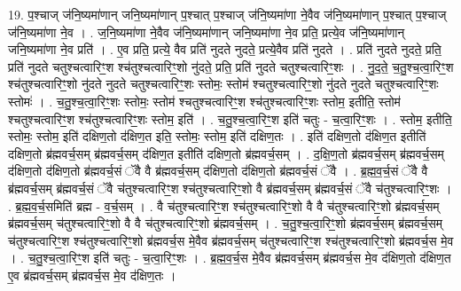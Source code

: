 \documentclass[17pt]{extarticle}
\begin{document}
19. प॒श्चाज् ज॑नि॒ष्यमा॑णान् जनि॒ष्यमा॑णान् प॒श्चात् प॒श्चाज् ज॑नि॒ष्यमा॑णा ने॒वैव ज॑नि॒ष्यमा॑णान् प॒श्चात् प॒श्चाज् ज॑नि॒ष्यमा॑णा ने॒व । . ज॒नि॒ष्यमा॑णा ने॒वैव ज॑नि॒ष्यमा॑णान् जनि॒ष्यमा॑णा ने॒व प्रति॒ प्रत्ये॒व ज॑नि॒ष्यमा॑णान् जनि॒ष्यमा॑णा ने॒व प्रति॑ । . ए॒व प्रति॒ प्रत्ये॒ वैव प्रति॑ नुदते नुदते॒ प्रत्ये॒वैव प्रति॑ नुदते । . प्रति॑ नुदते नुदते॒ प्रति॒ प्रति॑ नुदते चतुश्चत्वारिꣳ॒॒श श्च॑तुश्चत्वारिꣳ॒॒शो नु॑दते॒ प्रति॒ प्रति॑ नुदते चतुश्चत्वारिꣳ॒॒शः । . नु॒द॒ते॒ च॒तु॒श्च॒त्वा॒रिꣳ॒॒श श्च॑तुश्चत्वारिꣳ॒॒शो नु॑दते नुदते चतुश्चत्वारिꣳ॒॒शः स्तोमः॒ स्तोम॑ श्चतुश्चत्वारिꣳ॒॒शो नु॑दते नुदते चतुश्चत्वारिꣳ॒॒शः स्तोमः॑ । . च॒तु॒श्च॒त्वा॒रिꣳ॒॒शः स्तोमः॒ स्तोम॑ श्चतुश्चत्वारिꣳ॒॒श श्च॑तुश्चत्वारिꣳ॒॒शः स्तोम॒ इतीति॒ स्तोम॑ श्चतुश्चत्वारिꣳ॒॒श श्च॑तुश्चत्वारिꣳ॒॒शः स्तोम॒ इति॑ । . च॒तु॒श्च॒त्वा॒रिꣳ॒॒श इति॑ चतुः - च॒त्वा॒रिꣳ॒॒शः । . स्तोम॒ इतीति॒ स्तोमः॒ स्तोम॒ इति॑ दक्षिण॒तो द॑क्षिण॒त इति॒ स्तोमः॒ स्तोम॒ इति॑ दक्षिण॒तः । . इति॑ दक्षिण॒तो द॑क्षिण॒त इतीति॑ दक्षिण॒तो ब्र॑ह्मवर्च॒सम् ब्र॑ह्मवर्च॒सम् द॑क्षिण॒त इतीति॑ दक्षिण॒तो ब्र॑ह्मवर्च॒सम् । . द॒क्षि॒ण॒तो ब्र॑ह्मवर्च॒सम् ब्र॑ह्मवर्च॒सम् द॑क्षिण॒तो द॑क्षिण॒तो ब्र॑ह्मवर्च॒सं ॅवै वै ब्र॑ह्मवर्च॒सम् द॑क्षिण॒तो द॑क्षिण॒तो ब्र॑ह्मवर्च॒सं ॅवै । . ब्र॒ह्म॒व॒र्च॒सं ॅवै वै ब्र॑ह्मवर्च॒सम् ब्र॑ह्मवर्च॒सं ॅवै च॑तुश्चत्वारिꣳ॒॒श श्च॑तुश्चत्वारिꣳ॒॒शो वै ब्र॑ह्मवर्च॒सम् ब्र॑ह्मवर्च॒सं ॅवै च॑तुश्चत्वारिꣳ॒॒शः । . ब्र॒ह्म॒व॒र्च॒समिति॑ ब्रह्म - व॒र्च॒सम् । . वै च॑तुश्चत्वारिꣳ॒॒श श्च॑तुश्चत्वारिꣳ॒॒शो वै वै च॑तुश्चत्वारिꣳ॒॒शो ब्र॑ह्मवर्च॒सम् ब्र॑ह्मवर्च॒सम् च॑तुश्चत्वारिꣳ॒॒शो वै वै च॑तुश्चत्वारिꣳ॒॒शो ब्र॑ह्मवर्च॒सम् । . च॒तु॒श्च॒त्वा॒रिꣳ॒॒शो ब्र॑ह्मवर्च॒सम् ब्र॑ह्मवर्च॒सम् च॑तुश्चत्वारिꣳ॒॒श श्च॑तुश्चत्वारिꣳ॒॒शो ब्र॑ह्मवर्च॒स मे॒वैव ब्र॑ह्मवर्च॒सम् च॑तुश्चत्वारिꣳ॒॒श श्च॑तुश्चत्वारिꣳ॒॒शो ब्र॑ह्मवर्च॒स मे॒व । . च॒तु॒श्च॒त्वा॒रिꣳ॒॒श इति॑ चतुः - च॒त्वा॒रिꣳ॒॒शः । . ब्र॒ह्म॒व॒र्च॒स मे॒वैव ब्र॑ह्मवर्च॒सम् ब्र॑ह्मवर्च॒स मे॒व द॑क्षिण॒तो द॑क्षिण॒त ए॒व ब्र॑ह्मवर्च॒सम् ब्र॑ह्मवर्च॒स मे॒व द॑क्षिण॒तः । \newline
\end{document}

